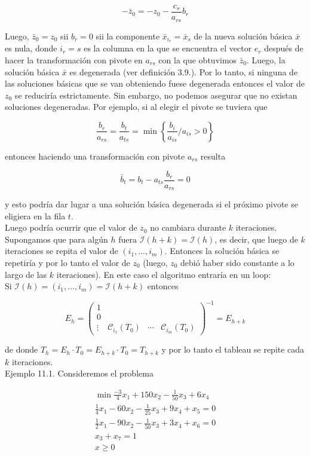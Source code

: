 \documentclass[10pt]{article}
\begin{document}
$$
-\bar{z}_{0}=-z_{0}-\frac{c_{s}}{a_{r s}} b_{r}
$$

Luego, $\bar{z}_{0}=z_{0}$ sii $b_{r}=0$ sii la componente $\bar{x}_{i_{r}}=\bar{x}_{s}$ de la nueva solución básica $\bar{x}$ es nula, donde $i_{r}=s$ es la columna en la que se encuentra el vector $e_{r}$ después de hacer la transformación con pivote en $a_{r s}$ con la que obtuvimos $\bar{z}_{0}$. Luego, la solución básica $\bar{x}$ es degenerada (ver definición 3.9.). Por lo tanto, si ninguna de las soluciones básicas que se van obteniendo fuese degenerada entonces el valor de $z_{0}$ se reduciría estrictamente. Sin embargo, no podemos asegurar que no existan soluciones degeneradas. Por ejemplo, si al elegir el pivote se tuviera que

$$
\frac{b_{r}}{a_{r s}}=\frac{b_{t}}{a_{t s}}=\min \left\{\frac{b_{i}}{a_{i s}} / a_{i s}>0\right\}
$$

entonces haciendo una transformación con pivote $a_{r s}$ resulta

$$
\bar{b}_{t}=b_{t}-a_{t s} \frac{b_{r}}{a_{r s}}=0
$$

y esto podría dar lugar a una solución básica degenerada si el próximo pivote se eligiera en la fila $t$.\\
Luego podría ocurrir que el valor de $z_{0}$ no cambiara durante $k$ iteraciones. Supongamos que para algún $h$ fuera $\mathcal{I}(h+k)=\mathcal{I}(h)$, es decir, que luego de $k$ iteraciones se repita el valor de $\left(i_{1}, \ldots, i_{m}\right)$. Entonces la solución básica se repetiría y por lo tanto el valor de $z_{0}$ (luego, $z_{0}$ debió haber sido constante a lo largo de las $k$ iteraciones). En este caso el algoritmo entraría en un loop:\\
Si $\mathcal{I}(h)=\left(i_{1}, \ldots, i_{m}\right)=\mathcal{I}(h+k)$ entonces

$$
E_{h}=\left(\begin{array}{llll}
1 & & & \\
0 & & & \\
\vdots & \mathcal{C}_{i_{1}}\left(T_{0}\right) & \cdots & \mathcal{C}_{i_{m}}\left(T_{0}\right)
\end{array}\right)^{-1}=E_{h+k}
$$

de donde $T_{h}=E_{h} \cdot T_{0}=E_{h+k} \cdot T_{0}=T_{h+k}$ y por lo tanto el tableau se repite cada $k$ iteraciones.\\
Ejemplo 11.1. Consideremos el problema

$$
\begin{gathered}
\min \frac{-3}{4} x_{1}+150 x_{2}-\frac{1}{50} x_{3}+6 x_{4} \\
\frac{1}{4} x_{1}-60 x_{2}-\frac{1}{25} x_{3}+9 x_{4}+x_{5}=0 \\
\frac{1}{2} x_{1}-90 x_{2}-\frac{1}{50} x_{3}+3 x_{4}+x_{6}=0 \\
x_{3}+x_{7}=1 \\
x \geq 0
\end{gathered}
$$
\end{document}
